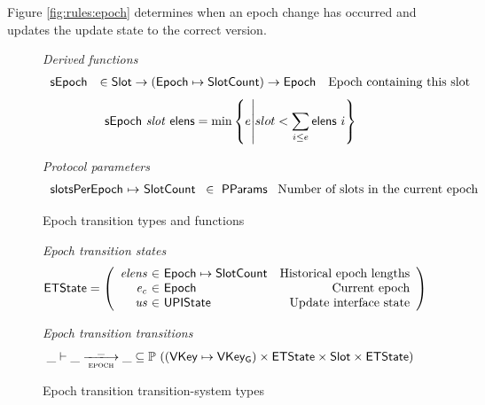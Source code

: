 \documentclass[11pt,a4paper]{article}
\newcommand{\powerset}[1]{\mathbb{P}~#1}
\newcommand{\var}[1]{\mathit{#1}}
\newcommand{\fun}[1]{\mathsf{#1}}
\newcommand{\type}[1]{\mathsf{#1}}
\newcommand{\pp}[1]{\mathsf{#1}}
\newcommand{\trans}[2]{\xlongrightarrow[\textsc{#1}]{#2}}
\newcommand{\totalf}{\to}
\newcommand{\partialf}{\mapsto}
\newcommand{\Slot}{\type{Slot}}
\newcommand{\SlotCount}{\type{SlotCount}}
\newcommand{\VKey}{\type{VKey}}
\newcommand{\VKeyGen}{\type{VKey_G}}
\newcommand{\ProtParams}{\type{PParams}} %
\begin{document}
Figure \ref{fig:rules:epoch} determines when an epoch change has occurred and
updates the update state to the correct version.

\begin{figure}[ht]
  \emph{Derived functions}
  \begin{equation*}
    \begin{array}{rlr}
      \fun{\sepochname} & \in \Slot \totalf (\Epoch \partialf \SlotCount) \totalf \Epoch & \text{Epoch containing this slot} \\
    \end{array}
  \end{equation*}
  \begin{equation*}
      \fun{\sepochname}~\var{slot}~\fun{elens} = \min  \left\{ e \middle| slot < \sum_{i \leq e} \fun{elens}~i \right\}
  \end{equation*}

  \emph{Protocol parameters}
  \begin{equation*}
    \begin{array}{r@{~\partialf~}l!{~\in~\ProtParams~}r}
      \pp{slotsPerEpoch} & \SlotCount & \text{Number of slots in the current epoch} \\
    \end{array}
  \end{equation*}

  \caption{Epoch transition types and functions}
  \label{fig:defs:epoch}
\end{figure}

\begin{figure}[ht]

  \emph{Epoch transition states}
  \begin{equation*}
    \ETState =
    \left(
      \begin{array}{r@{~\in~}lr}
        \var{elens} & \Epoch \partialf \SlotCount & \text{Historical epoch lengths} \\
        \var{e_c} & \Epoch & \text{Current epoch} \\
        \var{us} & \UPIState & \text{Update interface state}
      \end{array}
    \right)
  \end{equation*}

  \emph{Epoch transition transitions}
  \begin{equation*}
    \_ \vdash \var{\_} \trans{epoch}{\_} \var{\_} \subseteq
    \powerset ((\VKey \mapsto \VKeyGen) \times \ETState \times \Slot \times \ETState)
  \end{equation*}
  \caption{Epoch transition transition-system types}
  \label{fig:ts-types:epoch}
\end{figure}
\end{document}
